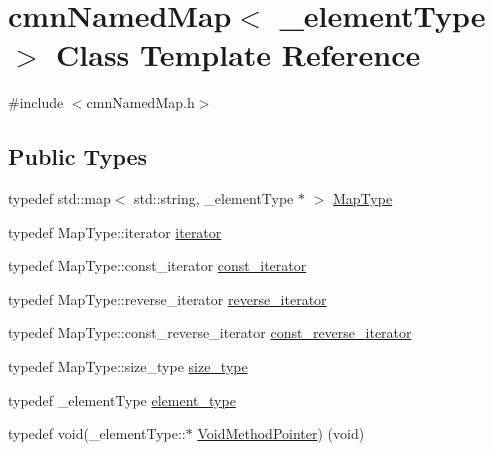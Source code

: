 \hypertarget{classcmn_named_map}{}\section{cmn\+Named\+Map$<$ \+\_\+element\+Type $>$ Class Template Reference}
\label{classcmn_named_map}


{\ttfamily \#include $<$cmn\+Named\+Map.\+h$>$}

\subsection*{Public Types}
\begin{DoxyCompactItemize}
\item 
typedef std\+::map$<$ std\+::string, \+\_\+element\+Type $\ast$ $>$ \hyperlink{classcmn_named_map_a35919ad9cccf3e060063b489db663425}{Map\+Type}
\item 
typedef Map\+Type\+::iterator \hyperlink{classcmn_named_map_a0ad463b349c3c95e8f639e12f492765e}{iterator}
\item 
typedef Map\+Type\+::const\+\_\+iterator \hyperlink{classcmn_named_map_a94a2be09d6678944e3a330c641d69d41}{const\+\_\+iterator}
\item 
typedef Map\+Type\+::reverse\+\_\+iterator \hyperlink{classcmn_named_map_abfbc3bd1bf3e0ea32fcdf61db4377014}{reverse\+\_\+iterator}
\item 
typedef Map\+Type\+::const\+\_\+reverse\+\_\+iterator \hyperlink{classcmn_named_map_ad32ba46e0f30a14d943acac6b229094c}{const\+\_\+reverse\+\_\+iterator}
\item 
typedef Map\+Type\+::size\+\_\+type \hyperlink{classcmn_named_map_aaaf5963f1e9b26efb08e7f0cd7199335}{size\+\_\+type}
\item 
typedef \+\_\+element\+Type \hyperlink{classcmn_named_map_a04797ca34105e40893cf1bdbea391f32}{element\+\_\+type}
\item 
typedef void(\+\_\+element\+Type\+::$\ast$ \hyperlink{classcmn_named_map_a78add53bc0e9b925dc3c5ec981994d2b}{Void\+Method\+Pointer}) (void)
\end{DoxyCompactItemize}
